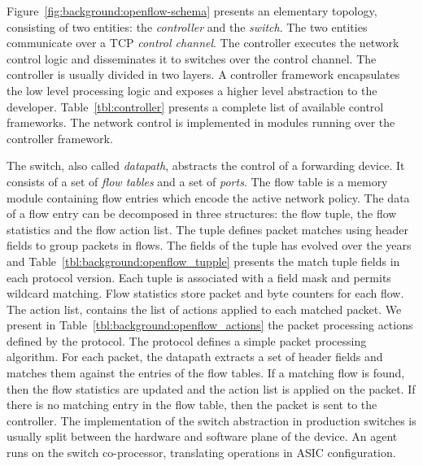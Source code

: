 Figure~\ref{fig:background:openflow-schema} presents an elementary \of topology,
consisting of two entities: the \textit{controller} and the \textit{switch}. The
two entities communicate over a TCP \textit{control channel}.  The \of controller
executes the network control logic and disseminates it to switches over
the control channel. The controller is usually divided in two layers. A controller
framework encapsulates the low level \of processing logic and exposes a higher
level abstraction to the developer.  Table~\ref{tbl:controller} presents a
complete list of available \of control frameworks.  The network control is
implemented in modules running over the controller framework. 


The \of switch, also called \textit{datapath}, abstracts the control of a
forwarding device. It consists of a set of \textit{flow tables}
and a set of \textit{ports}. The flow table is a memory module containing flow
entries which encode the active network policy. The data of a flow entry can be
decomposed in three structures: the flow tuple, the flow statistics and the flow
action list.  The tuple defines packet matches using header fields to group packets in
flows.  The fields of the tuple has evolved over the years and
Table~\ref{tbl:background:openflow_tupple} presents the match tuple fields
in each protocol version. Each tuple is associated with a field mask and permits
wildcard matching.  Flow statistics store packet and byte counters for each
flow. The action list, contains the list of actions applied to each matched
packet.  We present in Table~\ref{tbl:background:openflow_actions} the packet
processing actions defined by the \of protocol.  The protocol defines a simple
packet processing algorithm.  For each packet, the datapath extracts a set
of header fields and matches them against the entries of the flow tables.  If a
matching flow is found, then the flow statistics are updated and the action list
is applied on the packet. If there is no matching entry in the flow table, then
the packet is sent to the controller. The implementation of the \of switch
abstraction in production switches is usually split between the hardware and
software plane of the device. An \of agent runs on the switch co-processor,
translating \of operations in ASIC configuration.  


